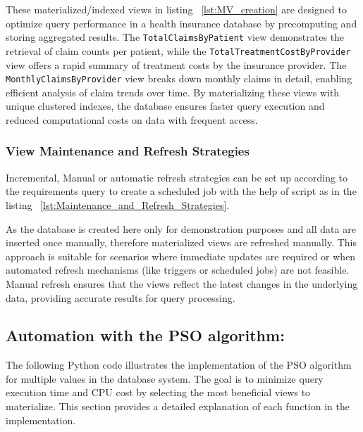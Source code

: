   \vspace{.4cm} 



These materialized/indexed views in listing ~\ref{lst:MV_creation} are designed to optimize query performance in a health insurance database by precomputing and storing aggregated results. The \texttt{TotalClaimsByPatient} view demonstrates the retrieval of claim counts per patient, while the \texttt{TotalTreatmentCostByProvider} view offers a rapid summary of treatment costs by the insurance provider. The \texttt{MonthlyClaimsByProvider} view breaks down monthly claims in detail, enabling efficient analysis of claim trends over time. By materializing these views with unique clustered indexes, the database ensures faster query execution and reduced computational costs on data with frequent access.



  \subsubsection{View Maintenance and Refresh Strategies}\label{View_maintainance} Incremental, Manual or automatic refresh strategies can be set up according to the requirements query to create a scheduled job with the help of script as in the listing ~\ref{lst:Maintenance_and_Refresh_Strategies}.\vspace{.4cm}

\vspace{.4cm}

As the database is created here only for demonstration purposes and all data are inserted once manually, therefore materialized views are refreshed manually. This approach is suitable for scenarios where immediate updates are required or when automated refresh mechanisms (like triggers or scheduled jobs) are not feasible. Manual refresh ensures that the views reflect the latest changes in the underlying data, providing accurate results for query processing.\vspace{.4cm}

\subsection{Automation with the PSO algorithm:} \label{Cost_evaluation}
 The following Python code illustrates the implementation of the PSO algorithm for multiple values in the database system. The goal is to minimize query execution time and CPU cost by selecting the most beneficial views to materialize. This section provides a detailed explanation of each function in the implementation.



